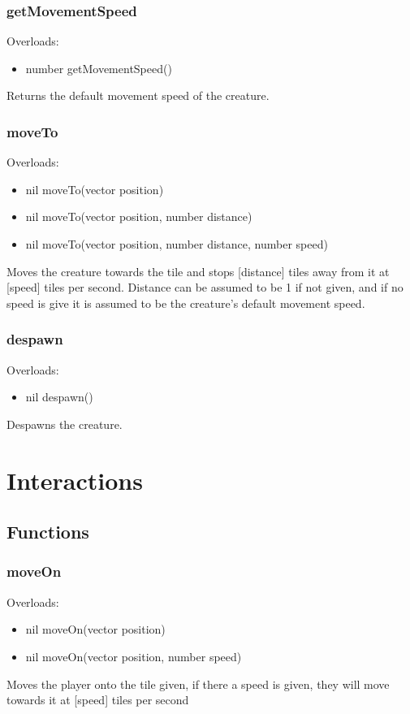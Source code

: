 \documentclass{book}
\newenvironment{ulist}
	{\begin{itemize}
			\itemsep0em}
	{\end{itemize}}
\begin{document}
\subsubsection{getMovementSpeed}
Overloads:
\begin{ulist}
	\item number getMovementSpeed()
\end{ulist}
Returns the default movement speed of the creature.

\subsubsection{moveTo}
Overloads:
\begin{ulist}
	\item nil moveTo(vector position)
	\item nil moveTo(vector position, number distance)
	\item nil moveTo(vector position, number distance, number speed)
\end{ulist}
Moves the creature towards the tile and stops [distance] tiles away from it at [speed] tiles per second. Distance can be assumed to be 1 if not given, and if no speed is give it is assumed to be the creature's default movement speed.

\subsubsection{despawn}
Overloads:
\begin{ulist}
	\item nil despawn()
\end{ulist}
Despawns the creature.



\section{Interactions}
\subsection{Functions}
\subsubsection{moveOn}
Overloads:
\begin{ulist}
	\item nil moveOn(vector position)
	\item nil moveOn(vector position, number speed)	
\end{ulist}
Moves the player onto the tile given, if there a speed is given, they will move towards it at [speed] tiles per second
\end{document}
